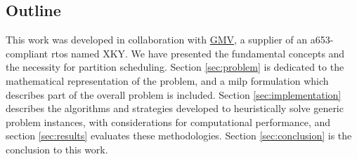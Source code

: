 \documentclass[main.tex]{subfiles}
\begin{document}
\subsection{Outline}

This work was developed in collaboration with \href{https://www.gmv.com/en/}{GMV}, a supplier of an \gls{a653}-compliant \gls{rtos} named XKY.
We have presented the fundamental concepts and the necessity for partition scheduling.
Section \ref{sec:problem} is dedicated to the mathematical representation of the problem, and a \gls{milp} formulation which describes part of the overall problem is included.
Section \ref{sec:implementation} describes the algorithms and strategies developed to heuristically solve generic problem instances, with considerations for computational performance, and section \ref{sec:results} evaluates these methodologies.
Section \ref{sec:conclusion} is the conclusion to this work.
\end{document}
